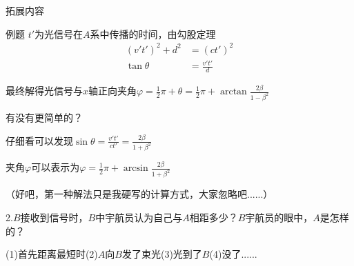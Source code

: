 \documentclass[a4paper,titlepage,onecolmn]{ctexart}
\begin{document}
\begin{section}{拓展内容}
\begin{subsection}{例题}
$t'$为光信号在$A$系中传播的时间，由勾股定理
\begin{align*}
(v't')^2+d^2&=(ct')^2\\\tan{\theta}&=\frac{v't'}{d}
\end{align*}

最终解得光信号与$x$轴正向夹角$\varphi=\frac{1}{2}\pi+\theta=\frac{1}{2}\pi+\arctan{\frac{2\beta}{1-\beta^2}}$

有没有更简单的？

仔细看可以发现$\sin{\theta}=\frac{v't'}{ct'}=\frac{2\beta}{1+\beta^2}$

夹角$\varphi$可以表示为$\varphi=\frac{1}{2}\pi+\arcsin{\frac{2\beta}{1+\beta^2}}$

（好吧，第一种解法只是我硬写的计算方式，大家忽略吧......）

2.$B$接收到信号时，$B$中宇航员认为自己与$A$相距多少？$B$宇航员的眼中，$A$是怎样的？

(1)首先距离最短时\hspace{2em}(2)$A$向$B$发了束光\hspace{2em}(3)光到了$B$\hspace{2em}(4)没了......


\end{subsection}
\end{section}
\end{document}
